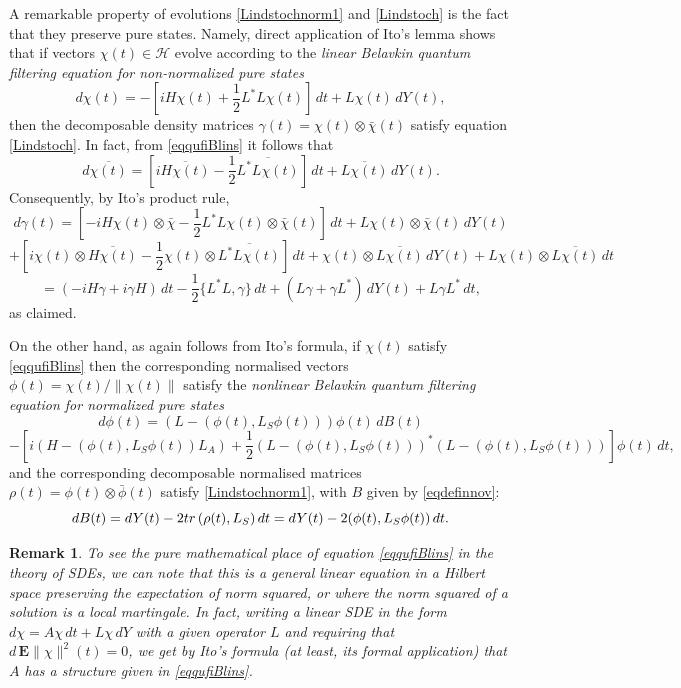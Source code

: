 \documentclass[10pt,a4paper]{amsart}
\def\HC{\mathcal{H}}
\def\E{\mathbf{E}}
\def\tr{\rm{tr}}
\def\ga{\gamma}
\newtheorem{remark}{Remark}
\begin{document}
A remarkable property of evolutions \eqref{Lindstochnorm1} and  \eqref{Lindstoch} is the fact that
they preserve pure states. Namely, direct application of Ito's lemma shows that if vectors
 $\chi(t)\in \HC$ evolve according to the {\it linear Belavkin quantum filtering equation
 for non-normalized pure states}
\begin{equation}
\label{eqqufiBlins}
d\chi(t) =-[iH\chi(t) +\frac12 L^*L \chi(t) ]\,dt+L\chi(t) \, dY(t),
\end{equation}
then the decomposable density matrices $\ga(t)=\chi(t)\otimes \bar \chi(t)$
satisfy equation \eqref{Lindstoch}. In fact, from \eqref{eqqufiBlins} it follows that
\[
d\overline{\chi(t)} =[i \overline{H\chi(t)} -\frac12 \overline{L^*L \chi(t)} ]\,dt+\overline{L\chi(t)}\, dY(t).
\]
Consequently, by Ito's product rule,
\[
d\ga(t)=[-iH\chi(t)\otimes \bar \chi -\frac12 L^*L \chi(t)\otimes \bar \chi (t)]\,dt+L\chi(t)\otimes \bar \chi(t) \, dY(t)
\]
\[
+[i \chi(t)\otimes \overline{H\chi(t)} -\frac12 \chi(t) \otimes \overline{L^*L \chi(t)} ]\,dt
+\chi(t)\otimes \overline{L\chi(t)}\, dY(t)+L\chi(t) \otimes \overline{L\chi(t)} \, dt
\]
\[
=(-iH\ga+i\ga H)\, dt -\frac12 \{L^*L,\ga\} \, dt +(L\ga+\ga L^*) \, dY(t)+L\ga L^* \, dt,
\]
as claimed.

On the other hand, as again follows from Ito's formula,
if $\chi(t)$ satisfy \eqref{eqqufiBlins}
then the corresponding normalised vectors $\phi(t)=\chi(t)/\|\chi(t)\|$ satisfy
the {\it nonlinear Belavkin quantum filtering equation for normalized pure states}
\[
d\phi(t)=(L-(\phi(t), L_S \phi(t)))\phi(t) \, dB(t)
\]
\begin{equation}
\label{eqqufiBnonlins}
-[i(H-(\phi(t), L_S \phi(t)) L_A)
+\frac12 (L-(\phi(t), L_S \phi(t)))^*(L-(\phi(t), L_S \phi(t)))]\phi(t) \, dt,
\end{equation}
and the corresponding decomposable normalised
matrices $\rho(t) =\phi(t)\otimes \bar \phi(t)$ satisfy \eqref{Lindstochnorm1},
with $B$ given by \eqref{eqdefinnov}:
\[
dB(t)=dY(t)-2{\tr} \, (\rho(t), L_S) \, dt=dY(t)-2(\phi(t), L_S \phi(t))\, dt.
\]

\begin{remark}
To see the pure mathematical place of equation \eqref{eqqufiBlins} in the theory of SDEs, we can note that
this is a general linear equation in a Hilbert space preserving the expectation of norm squared,
or where the norm squared of a solution is a local martingale. In fact, writing a linear SDE in the form
$d\chi=A\chi \,dt +L\chi \, dY$ with a given operator $L$ and requiring that $d \, \E \|\chi\| ^2(t)=0$,
we get by Ito's formula (at least, its formal application) that $A$ has a structure given in \eqref{eqqufiBlins}.
\end{remark}
\end{document}
